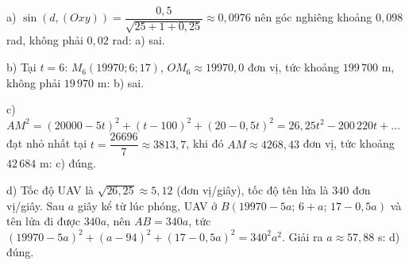 \begin{ex}
{a) $\sin\left(d,(Oxy)\right)=\dfrac{0{,}5}{\sqrt{25+1+0{,}25}}\approx0{,}0976$ nên góc nghiêng khoảng $0{,}098$ rad, không phải $0{,}02$ rad: a) sai.

b) Tại $t=6$: $M_6(19970;6;17)$, $OM_6\approx19970{,}0$ đơn vị, tức khoảng $199\,700$ m, không phải $19\,970$ m: b) sai.

c) $AM^2=(20000-5t)^2+(t-100)^2+(20-0{,}5t)^2=26{,}25t^2-200\,220t+\dots$ đạt nhỏ nhất tại $t=\dfrac{26696}7\approx3813{,}7$, khi đó $AM\approx4268{,}43$ đơn vị, tức khoảng $42\,684$ m: c) đúng.

d) Tốc độ UAV là $\sqrt{26{,}25}\approx5{,}12$ (đơn vị/giây), tốc độ tên lửa là $340$ đơn vị/giây. Sau $a$ giây kể từ lúc phóng, UAV ở $B(19970-5a;\,6+a;\,17-0{,}5a)$ và tên lửa đi được $340a$, nên $AB=340a$, tức $(19970-5a)^2+(a-94)^2+(17-0{,}5a)^2=340^2a^2$. Giải ra $a\approx57{,}88$ s: d) đúng.}
\end{ex}
